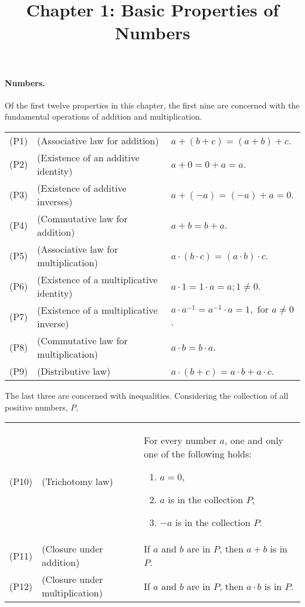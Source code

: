 \documentclass{article}
\begin{document}
\title{Chapter 1: Basic Properties of Numbers}
\maketitle

\paragraph{Numbers.} Of the first twelve properties in this chapter, the first nine are concerned with the fundamental operations of addition and multiplication.

\begin{tabular}{l l p{4in}}
  (P1) & (Associative law for addition) & $a + (b + c) = (a + b) + c$. \label{p1} \\
  (P2) & (Existence of an additive identity) & $a + 0 = 0 + a = a$. \label{p2} \\
  (P3) & (Existence of additive inverses) & $a + (-a) = (-a) + a = 0$. \label{p3} \\
  (P4) & (Commutative law for addition) & $a + b = b + a$. \label{p4} \\
  (P5) & (Associative law for multiplication) & $a \cdot (b \cdot c) = (a \cdot b) \cdot c$. \label{p5} \\
  (P6) & (Existence of a multiplicative identity) & $a \cdot 1 = 1 \cdot a = a; 1 \neq 0$. \label{p6} \\
  (P7) & (Existence of a multiplicative inverse) & $a \cdot a^{-1} = a^{-1} \cdot a = 1, \text{ for } a \neq 0$. \label{p7} \\
  (P8) & (Commutative law for multiplication) & $a \cdot b = b \cdot a$. \label{p8} \\
  (P9) & (Distributive law) & $a \cdot (b + c) = a \cdot b + a \cdot c$. \label{p9}
\end{tabular}

The last three are concerned with inequalities. Considering the collection of all positive numbers, $P$,

\begin{tabular}{l l p{2.5in}}
  (P10) & (Trichotomy law) & For every number $a$, one and only one of the following holds: \begin{enumerate}
      \itemsep0em
      \item $a = 0$,
      \item $a$ is in the collection $P$,
      \item $-a$ is in the collection $P$. \label{p10}
    \end{enumerate} \\
  (P11) & (Closure under addition) & If $a$ and $b$ are in $P$, then $a + b$ is in $P$. \\
  (P12) & (Closure under multiplication) & If $a$ and $b$ are in $P$, then $a \cdot b$ is in $P$.
\end{tabular}
\end{document}
